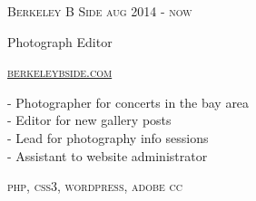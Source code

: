 {
    \textsc{\small{Berkeley B Side
            \hfill
            {\raggedleft
                aug 2014 - now
            }
        }
    }

    {\raggedright\large {
        Photograph Editor
    } \\}

    \textsc{\small\href{http://www.berkeleybside.com}{berkeleybside.com}}

    \normalsize{
        - Photographer for concerts in the bay area\\
        - Editor for new gallery posts \\
        - Lead for photography info sessions\\
        - Assistant to website administrator
    }

    \textsc{\small{\color{highlight}
        php,
        css3,
        wordpress,
        adobe cc
    }} \\
}
